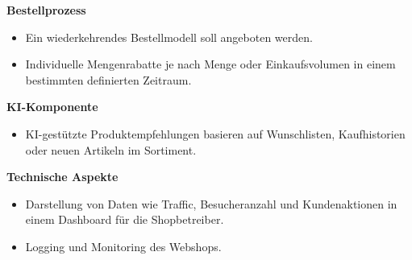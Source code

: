 \documentclass[%
	ngerman,
	12pt,
	a4paper,
	oneside,
	parskip=full
]{scrbook}
\begin{document}
	\vspace{0.5cm}
	\textbf{Bestellprozess}
	\begin{itemize}
		\item Ein wiederkehrendes Bestellmodell soll angeboten werden.
		\item Individuelle Mengenrabatte je nach Menge oder Einkaufsvolumen in einem bestimmten definierten Zeitraum.
	\end{itemize}

	\vspace{0.5cm}
	\textbf{KI-Komponente}
	\begin{itemize}
		\item KI-gestützte Produktempfehlungen basieren auf Wunschlisten, Kaufhistorien oder neuen Artikeln im Sortiment.
	\end{itemize}

	\vspace{0.5cm}
	\textbf{Technische Aspekte}
	\begin{itemize}
		\item Darstellung von Daten wie Traffic, Besucheranzahl und Kundenaktionen in einem Dashboard für die Shopbetreiber.
		\item Logging und Monitoring des Webshops.
	\end{itemize}
\end{document}
